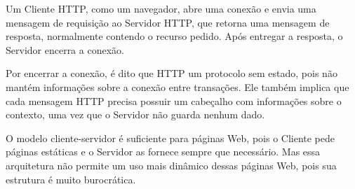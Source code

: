 \documentclass[a4paper,12pt]{article}
\begin{document}
Um Cliente HTTP, como um navegador, abre uma conexão e envia uma mensagem de requisição ao Servidor HTTP, que retorna uma mensagem de resposta, normalmente contendo o recurso pedido. Após entregar a resposta, o Servidor encerra a conexão.

Por encerrar a conexão, é dito que HTTP um protocolo sem estado, pois não mantém informações sobre a conexão entre transações. Ele também implica que cada mensagem HTTP precisa possuir um cabeçalho com informações sobre o contexto, uma vez que o Servidor não guarda nenhum dado.









O modelo cliente-servidor é suficiente para páginas Web, pois o Cliente pede páginas estáticas e o Servidor as fornece sempre que necessário. Mas essa arquitetura não permite um uso mais dinâmico dessas páginas Web, pois sua estrutura é muito burocrática.
\end{document}
